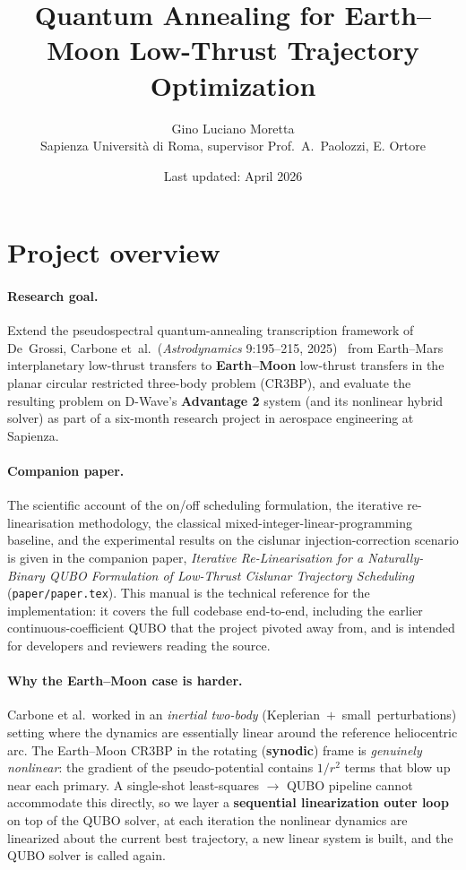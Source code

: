 \documentclass[8pt,a4paper]{article}
\title{Quantum Annealing for Earth--Moon Low-Thrust Trajectory Optimization}
\author{Gino Luciano Moretta \\
  \small Sapienza Universit\`a di Roma, supervisor Prof.\ A.\ Paolozzi, E. Ortore}
\date{Last updated: April 2026}
\theoremstyle{definition}
\theoremstyle{remark}
\begin{document}
\maketitle
\tableofcontents
\bigskip

\section{Project overview}

\paragraph{Research goal.}
Extend the pseudospectral quantum-annealing transcription framework of
De~Grossi, Carbone et~al.\ (\emph{Astrodynamics} 9:195--215,
2025)~\cite{Carbone2025} from Earth--Mars interplanetary low-thrust
transfers to \textbf{Earth--Moon} low-thrust transfers in the planar
circular restricted three-body problem (CR3BP), and evaluate the
resulting problem on D-Wave's \textbf{Advantage 2} system (and its
nonlinear hybrid solver) as part of a six-month research project in
aerospace engineering at Sapienza.

\paragraph{Companion paper.}
The scientific account of the on/off scheduling formulation, the
iterative re-linearisation methodology, the classical
mixed-integer-linear-programming baseline, and the experimental
results on the cislunar injection-correction scenario is given in
the companion paper, \emph{Iterative Re-Linearisation for a
Naturally-Binary QUBO Formulation of Low-Thrust Cislunar Trajectory
Scheduling} (\texttt{paper/paper.tex}). This manual is the
technical reference for the implementation: it covers the full
codebase end-to-end, including the earlier continuous-coefficient
QUBO that the project pivoted away from, and is intended for
developers and reviewers reading the source.

\paragraph{Why the Earth--Moon case is harder.}
Carbone et al.\ worked in an \emph{inertial two-body}
(Keplerian~$+$~small~perturbations) setting where the dynamics are
essentially linear around the reference heliocentric arc. The
Earth--Moon CR3BP in the rotating (\textbf{synodic}) frame is
\emph{genuinely nonlinear}: the gradient of the pseudo-potential
contains $1/r^2$ terms that blow up near each primary. A single-shot
least-squares $\rightarrow$ QUBO pipeline cannot accommodate this
directly, so we layer a \textbf{sequential linearization outer loop}
on top of the QUBO solver, at each iteration the nonlinear
dynamics are linearized about the current best trajectory, a new
linear system is built, and the QUBO solver is called again.
\end{document}

